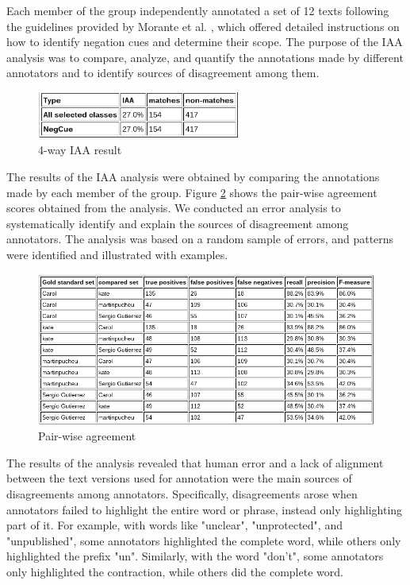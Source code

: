 Each member of the group independently annotated a set of 12 texts following the guidelines provided by Morante et al. \cite{morante2011annotation}, which offered detailed instructions on how to identify negation cues and determine their scope. The purpose of the IAA analysis was to compare, analyze, and quantify the annotations made by different annotators and to identify sources of disagreement among them.

\begin{figure}[!h]
\begin{center}
  \includegraphics[width=0.6\textwidth]{Plots and results/4way.png}
  \caption{4-way IAA result}
  \label{fig:4way}
\end{center}  
\end{figure}

The results of the IAA analysis were obtained by comparing the annotations made by each member of the group. Figure \ref{fig:Pairwise agreement} shows the pair-wise agreement scores obtained from the analysis. We conducted an error analysis to systematically identify and explain the sources of disagreement among annotators. The analysis was based on a random sample of errors, and patterns were identified and illustrated with examples.

\begin{figure}[!h]
  \includegraphics[width=\linewidth]{Plots and results/pairwise.png}
  \caption{Pair-wise agreement}
  \label{fig:Pairwise agreement}
\end{figure}

The results of the analysis revealed that human error and a lack of alignment between the text versions used for annotation were the main sources of disagreements among annotators. Specifically, disagreements arose when annotators failed to highlight the entire word or phrase, instead only highlighting part of it. For example, with words like "unclear", "unprotected", and "unpublished", some annotators highlighted the complete word, while others only highlighted the prefix "un". Similarly, with the word "don't", some annotators only highlighted the contraction, while others did the complete word. 

